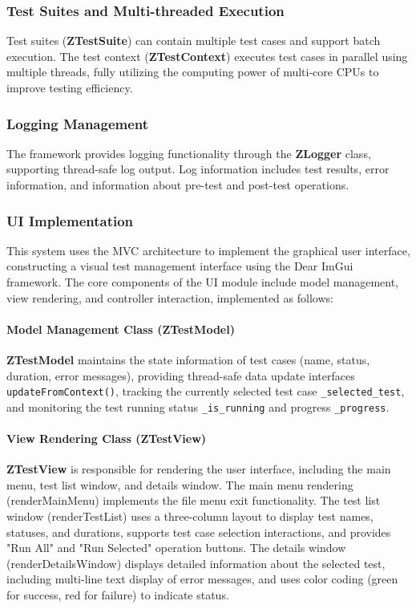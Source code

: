 \documentclass[english]{article}
\begin{document}
\subsubsection{Test Suites and Multi-threaded Execution}
Test suites (\textbf{ZTestSuite}) can contain multiple test cases and support batch execution. The test context (\textbf{ZTestContext}) executes test cases in parallel using multiple threads, fully utilizing the computing power of multi-core CPUs to improve testing efficiency.

\subsubsection{Logging Management}
The framework provides logging functionality through the \textbf{ZLogger} class, supporting thread-safe log output. Log information includes test results, error information, and information about pre-test and post-test operations.

\subsubsection{UI Implementation}
This system uses the MVC architecture to implement the graphical user interface, constructing a visual test management interface using the Dear ImGui framework. The core components of the UI module include model management, view rendering, and controller interaction, implemented as follows:

\paragraph{Model Management Class (\textbf{ZTestModel})}
\textbf{ZTestModel} maintains the state information of test cases (name, status, duration, error messages), providing thread-safe data update interfaces \texttt{updateFromContext()}, tracking the currently selected test case \texttt{\_selected\_test}, and monitoring the test running status \texttt{\_is\_running} and progress \texttt{\_progress}.

\paragraph{View Rendering Class (\textbf{ZTestView})}
\textbf{ZTestView} is responsible for rendering the user interface, including the main menu, test list window, and details window. The main menu rendering (renderMainMenu) implements the file menu exit functionality. The test list window (renderTestList) uses a three-column layout to display test names, statuses, and durations, supports test case selection interactions, and provides "Run All" and "Run Selected" operation buttons. The details window (renderDetailsWindow) displays detailed information about the selected test, including multi-line text display of error messages, and uses color coding (green for success, red for failure) to indicate status.
\end{document}
